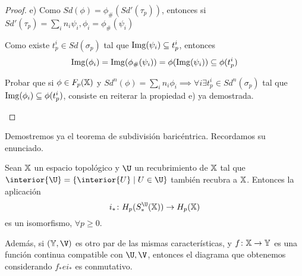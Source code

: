 \begin{proof}
  e) Como $Sd(\phi) = \phi_\#(Sd'(\tau_p))$, entonces si $Sd'(\tau_p) = \sum_i n_i \psi_i, \phi_i = \phi_\#(\psi_i)$

  Como existe $t_p^i \in Sd(\sigma_p)$ tal que $\operatorname{Img}(\psi_i) \subseteq t_p^i$, entonces
  \[\operatorname{Img}(\phi_i) = \operatorname{Img}(\phi_\#(\psi_i)) = \phi(\operatorname{Img}(\psi_i)) \subseteq \phi(t_p^i)\]

  \begin{remark}
    Probar que si $\phi \in F_p({\mathbb X})$ y $Sd^n(\phi) = \sum_i n_i \phi_i \implies \forall i \exists t_p^i \in Sd^n(\sigma_p)$ tal que
    $\operatorname{Img}(\phi_i) \subseteq \phi(t_p^i)$, consiste en reiterar la propiedad e) ya demostrada.
  \end{remark}

\end{proof}

Demostremos ya el teorema de subdivisión baricéntrica. Recordamos su enunciado.

\begin{theorem}
  Sean ${\mathbb X}$ un espacio topológico y $\U$ un recubrimiento de ${\mathbb X}$ tal que $\interior{\U} = \{\interior{U} \mid U \in \U\}$
  también recubra a ${\mathbb X}$. Entonces la aplicación
  \[ i_* \colon H_p(S_*^\U(\X)) \to H_p(\X) \]
  es un isomorfismo, $\forall p \geq 0$.

  Además, si $(\Y, \V)$ es otro par de las mismas características, y $f \colon {\mathbb X} \to {\mathbb Y}$ es una función continua
  compatible con $\U, \V$, entonces el diagrama que obtenemos considerando $f_* e i_*$ es conmutativo.
\end{theorem}

